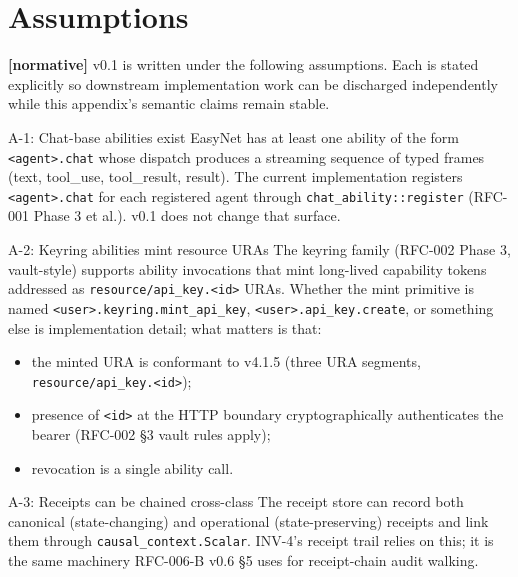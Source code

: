 \documentclass[11pt,a4paper]{article}
\newcommand{\normsv}{\textcolor{normativecolor}{\textbf{[normative]}}\xspace}
\theoremstyle{definition}
\begin{document}
\section{Assumptions}
\label{sec:assumptions}

\normsv{} v0.1 is written under the following assumptions. Each
is stated explicitly so downstream implementation work can be
discharged independently while this appendix's semantic claims
remain stable.

\begin{assumptionbox}{A-1: Chat-base abilities exist}
EasyNet has at least one ability of the form
\texttt{<agent>.chat} whose dispatch produces a streaming
sequence of typed frames (text, tool\_use, tool\_result,
result). The current implementation registers
\texttt{<agent>.chat} for each registered agent through
\texttt{chat\_ability::register} (RFC-001 Phase 3 et al.). v0.1
does not change that surface.
\end{assumptionbox}

\begin{assumptionbox}{A-2: Keyring abilities mint resource URAs}
The keyring family (RFC-002 Phase 3, vault-style) supports
ability invocations that mint long-lived capability tokens
addressed as \texttt{resource/api\_key.<id>} URAs. Whether the
mint primitive is named \texttt{<user>.keyring.mint\_api\_key},
\texttt{<user>.api\_key.create}, or something else is
implementation detail; what matters is that:

\begin{itemize}[leftmargin=2em,itemsep=0.1em]
    \item the minted URA is conformant to v4.1.5 (three URA segments,
    \texttt{resource/api\_key.<id>});
    \item presence of \texttt{<id>} at the HTTP boundary
    cryptographically authenticates the bearer (RFC-002 §3 vault
    rules apply);
    \item revocation is a single ability call.
\end{itemize}
\end{assumptionbox}

\begin{assumptionbox}{A-3: Receipts can be chained cross-class}
The receipt store can record both canonical (state-changing)
and operational (state-preserving) receipts and link them
through \texttt{causal\_context.Scalar}. INV-4's receipt trail
relies on this; it is the same machinery RFC-006-B v0.6 §5 uses
for receipt-chain audit walking.
\end{assumptionbox}
\end{document}
